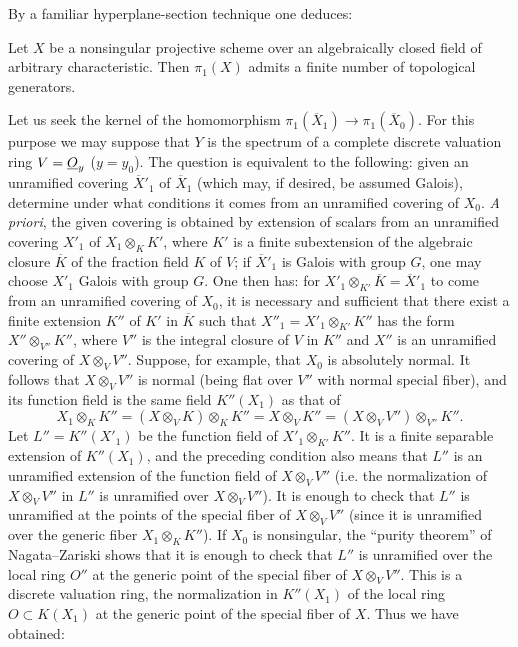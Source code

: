 By a familiar hyperplane-section technique one deduces:

 Let $X$ be a nonsingular projective scheme over an
algebraically closed field of arbitrary characteristic. Then $\pi_1(X)$
admits a finite number of topological generators.

Let us seek the kernel of the homomorphism
$\pi_1(\overline X_1)\longrightarrow\pi_1(\overline X_0)$. For this purpose we
may suppose that $Y$ is the spectrum of a complete discrete valuation ring
$V=\underline{O}_y$ ($y=y_0$). The question is equivalent to the following: given an
unramified covering $\overline X'_1$ of $\overline X_1$ (which may, if desired,
be assumed Galois), determine under what conditions it comes from an
unramified covering of $X_0$. \textit{A priori}, the given covering is obtained
by extension of scalars from an unramified covering $X'_1$ of
$X_1\otimes_K K'$, where $K'$ is a finite subextension of the algebraic closure
$\overline K$ of the fraction field $K$ of $V$; if $\overline X'_1$ is Galois
with group $G$, one may choose $X'_1$ Galois with group $G$. One then has: for
$X'_1\otimes_{K'}\overline K=\overline X'_1$ to come from an unramified
covering of $X_0$, it is necessary and sufficient that there exist a finite
extension $K''$ of $K'$ in $\overline K$ such that
$X''_1=X'_1\otimes_{K'}K''$ has the form $X''\otimes_{V''}K''$, where $V''$ is
the integral closure of $V$ in $K''$ and $X''$ is an unramified covering of
$X\otimes_VV''$. Suppose, for example, that $X_0$ is absolutely normal. It
follows that $X\otimes_VV''$ is normal (being flat over $V''$ with normal
special fiber), and its function field is the same field $K''(X_1)$ as that of
\[
  X_1\otimes_KK''
  =(X\otimes_VK)\otimes_KK''
  =X\otimes_VK''
  =(X\otimes_VV'')\otimes_{V''}K''.
\]
Let $L''=K''(X'_1)$ be the function field of
$X'_1\otimes_{K'}K''$. It is a finite separable extension of $K''(X_1)$, and
the preceding condition also means that $L''$ is an unramified extension of
the function field of $X\otimes_VV''$ (i.e. the normalization of
$X\otimes_VV''$ in $L''$ is unramified over $X\otimes_VV''$). It is enough to
check that $L''$ is unramified at the points of the special fiber of
$X\otimes_VV''$ (since it is unramified over the generic fiber
$X_1\otimes_KK''$). If $X_0$ is nonsingular, the “purity theorem” of
Nagata--Zariski shows that it is enough to check that $L''$ is unramified over
the local ring $O''$ at the generic point of the special fiber of
$X\otimes_VV''$. This is a discrete valuation ring, the normalization in
$K''(X_1)$ of the local ring $O\subset K(X_1)$ at the generic point of the
special fiber of $X$. Thus we have obtained:

